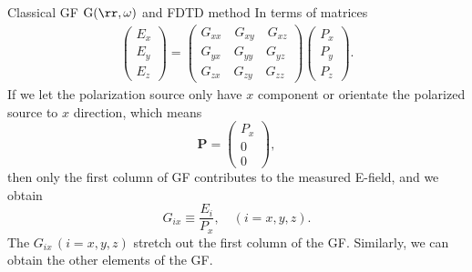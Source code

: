\documentclass{beamer}
\begin{document}
\begin{frame}{Classical GF $\mathrm{G}(\rr,\omega)$ and FDTD method}
\fontsize{8}{-0.2}\selectfont
In terms of matrices
\begin{align}
\label{EandGwithoutE0}
\left( \begin{array}{c}
       E_x\\
       E_y\\
       E_z  \end{array} \right)
                   = \left( \begin{array}{c}
                      G_{xx} \quad G_{xy} \quad G_{xz} \\
                      G_{yx} \quad G_{yy} \quad G_{yz} \\
                      G_{zx} \quad G_{zy} \quad G_{zz}  \end{array}  \right) \left( \begin{array}{c}
                                                                                     P_x\\
                                                                                     P_y\\
                                                                                     P_z
                                                                                    \end{array} \right).\nonumber
\end{align}
If we let the polarization source only have $x$ component or orientate the polarized source to $x$ direction, which means
\begin{equation}
 \label{Px}
\mathbf{P}=\left( \begin{array}{c}
                   P_x\\
                   0\\
                   0
                  \end{array} \right),
\end{equation}
then only the first column of GF contributes to the measured E-field, and we obtain
\begin{equation}
 \label{Gix}
G_{ix} \equiv \frac{E_{i}}{P_x}, \quad (i=x, y, z).
\end{equation}
The $G_{ix}\,(i=x, y, z)$ stretch out the first column of the GF. Similarly, we can obtain the other elements of the GF. 
\end{frame}
\end{document}
